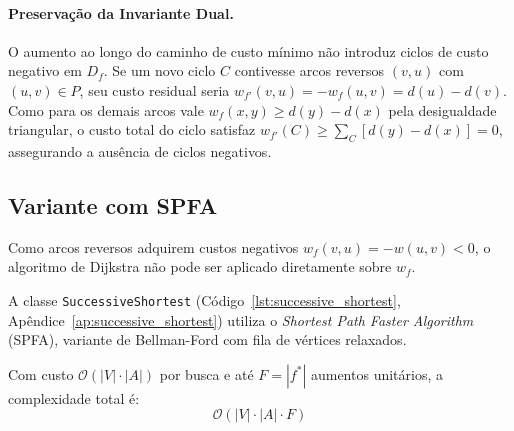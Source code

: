 \paragraph{Preservação da Invariante Dual.}
O aumento ao longo do caminho de custo mínimo não introduz ciclos de custo negativo em $D_f$. Se um novo ciclo $C$ contivesse arcos reversos $(v,u)$ com $(u,v) \in P$, seu custo residual seria $w_{f'}(v,u) = -w_f(u,v) = d(u) - d(v)$. Como para os demais arcos vale $w_f(x,y) \ge d(y) - d(x)$ pela desigualdade triangular, o custo total do ciclo satisfaz $w_{f'}(C) \ge \sum_C [d(y) - d(x)] = 0$, assegurando a ausência de ciclos negativos.


\subsection{Variante com SPFA}\label{sec:ssp_spfa}

Como arcos reversos adquirem custos negativos $w_f(v,u) = -w(u,v) < 0$, o algoritmo de Dijkstra não pode ser aplicado diretamente sobre $w_f$.

A classe \lstinline{SuccessiveShortest} (Código~\ref{lst:successive_shortest}, Apêndice~\ref{ap:successive_shortest}) utiliza o \textit{Shortest Path Faster Algorithm} (SPFA), variante de Bellman-Ford com fila de vértices relaxados.

Com custo $\mathcal{O}(|V| \cdot |A|)$ por busca e até $F = |f^*|$ aumentos unitários, a complexidade total é:
\begin{equation}
    \mathcal{O}(|V| \cdot |A| \cdot F)
\end{equation}


